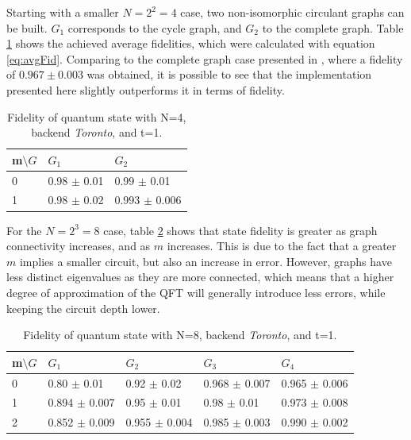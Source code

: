 \documentclass[../../dissertation.tex]{subfiles}
\begin{document}
Starting with a smaller $N = 2^2 = 4$ case, two non-isomorphic circulant
graphs can be built. $G_1$ corresponds to the cycle graph, and
$G_2$ to the complete graph. Table \ref{tab:N2TRT} shows the achieved average
fidelities, which were calculated with equation \eqref{eq:avgFid}. Comparing to
the complete graph case presented in \cite{qiang2016}, where a
fidelity of $0.967 \pm 0.003$ was obtained, it is possible to see that the implementation
presented here slightly outperforms it in terms of fidelity.
\begin{table}[!h]
\centering
\begin{tabular}{| l | l | l |}
\hline
m$\setminus G$ & $G_1$               & $G_2$  \\ \hline
0   & 0.98 $\pm$ 0.01 & 0.99 $\pm$ 0.01  \\\hline
1   & 0.98 $\pm$ 0.02 & 0.993 $\pm$ 0.006   \\\hline
\end{tabular}
\caption{Fidelity of quantum state with N=4, backend \textit{Toronto}, and t=1.}
\label{tab:N2TRT}
\end{table}\par

For the $N = 2^3 = 8$ case, table \ref{tab:N3TRT} shows that state fidelity is
greater as graph connectivity increases, and as $m$ increases. This is due to
the fact that a greater $m$ implies a smaller circuit, but also an increase in
error. However, graphs have less distinct eigenvalues as they are more
connected, which means that a higher degree of approximation of the QFT will
generally introduce less errors, while keeping the circuit depth
lower.
\begin{table}[!h]
\centering
\begin{tabular}{| l | l | l | l | l |}
\hline
m$\setminus G$ & $G_1$                & $G_2$                & $G_3$                & $G_4$    \\\hline
0   & 0.80 $\pm$ 0.01 & 0.92 $\pm$ 0.02     & 0.968 $\pm$ 0.007  & 0.965 $\pm$ 0.006 \\\hline
1   & 0.894 $\pm$ 0.007 & 0.95 $\pm$ 0.01   & 0.98 $\pm$ 0.01    & 0.973 $\pm$ 0.008 \\\hline
2   & 0.852 $\pm$ 0.009 & 0.955 $\pm$ 0.004 & 0.985 $\pm$ 0.003  & 0.990 $\pm$ 0.002 \\\hline
\end{tabular}
\caption{Fidelity of quantum state with N=8, backend \textit{Toronto}, and t=1.}
\label{tab:N3TRT}
\end{table}\par
\end{document}
